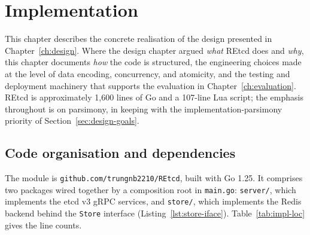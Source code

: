 %
%

\chapter{Implementation}
\label{ch:implementation}

This chapter describes the concrete realisation of the design presented in Chapter~\ref{ch:design}. Where the design chapter argued \emph{what} REtcd does and \emph{why}, this chapter documents \emph{how} the code is structured, the engineering choices made at the level of data encoding, concurrency, and atomicity, and the testing and deployment machinery that supports the evaluation in Chapter~\ref{ch:evaluation}. REtcd is approximately 1{,}600 lines of Go and a 107-line Lua script; the emphasis throughout is on parsimony, in keeping with the implementation-parsimony priority of Section~\ref{sec:design-goals}.

\section{Code organisation and dependencies}
\label{sec:impl-org}

The module is \texttt{github.com/trungnb2210/REtcd}, built with Go 1.25. It comprises two packages wired together by a composition root in \texttt{main.go}: \texttt{server/}, which implements the etcd v3 gRPC services, and \texttt{store/}, which implements the Redis backend behind the \texttt{Store} interface (Listing~\ref{lst:store-iface}). Table~\ref{tab:impl-loc} gives the line counts.

